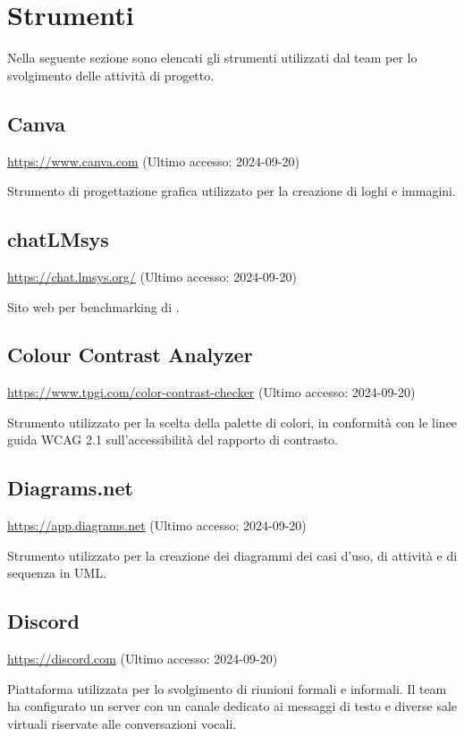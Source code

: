 \section{Strumenti}\label{strumenti}
\par Nella seguente sezione sono elencati gli strumenti utilizzati dal team per lo svolgimento delle attività di progetto.

\subsection{Canva}
\par \href{https://www.canva.com}{https://www.canva.com} (Ultimo accesso: 2024-09-20)
\par Strumento di progettazione grafica utilizzato per la creazione di loghi e immagini.

\subsection{chatLMsys}
\par \href{https://chat.lmsys.org/}{https://chat.lmsys.org/} (Ultimo accesso: 2024-09-20)
\par Sito web per benchmarking di .

\subsection{Colour Contrast Analyzer}
\par \href{https://www.tpgi.com/color-contrast-checker}{https://www.tpgi.com/color-contrast-checker} (Ultimo accesso: 2024-09-20)
\par Strumento utilizzato per la scelta della palette di colori, in conformità con le linee guida WCAG 2.1 sull'accessibilità del rapporto di contrasto.

\subsection{Diagrams.net}
\par \href{https://app.diagrams.net}{https://app.diagrams.net} (Ultimo accesso: 2024-09-20)
\par Strumento utilizzato per la creazione dei diagrammi dei casi d'uso, di attività e di sequenza in UML.

\subsection{Discord}
\par \href{https://discord.com}{https://discord.com} (Ultimo accesso: 2024-09-20)
\par Piattaforma utilizzata per lo svolgimento di riunioni formali e informali. Il team ha configurato un server con un canale dedicato ai messaggi di testo e diverse sale virtuali riservate alle conversazioni vocali.
    

